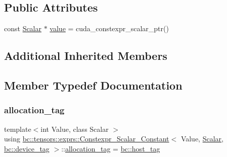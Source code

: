 \subsection*{Public Attributes}
\begin{DoxyCompactItemize}
\item 
const \hyperlink{namespacebc_aa12ac55ee2c43dc082894dd3859daee1}{Scalar} $\ast$ \hyperlink{structbc_1_1tensors_1_1exprs_1_1Constexpr__Scalar__Constant_3_01Value_00_01Scalar_00_01bc_1_1device__tag_01_4_aea23e94b5df6da8f57a6743fba40c72c}{value} = cuda\+\_\+constexpr\+\_\+scalar\+\_\+ptr()
\end{DoxyCompactItemize}
\subsection*{Additional Inherited Members}


\subsection{Member Typedef Documentation}
\mbox{\label{structbc_1_1tensors_1_1exprs_1_1Constexpr__Scalar__Constant_3_01Value_00_01Scalar_00_01bc_1_1device__tag_01_4_ae30cc6d15fe72585a06d08f7e6dae128}} 
\subsubsection{\texorpdfstring{allocation\+\_\+tag}{allocation\_tag}}
{\footnotesize\ttfamily template$<$int Value, class Scalar $>$ \\
using \hyperlink{structbc_1_1tensors_1_1exprs_1_1Constexpr__Scalar__Constant}{bc\+::tensors\+::exprs\+::\+Constexpr\+\_\+\+Scalar\+\_\+\+Constant}$<$ Value, \hyperlink{namespacebc_aa12ac55ee2c43dc082894dd3859daee1}{Scalar}, \hyperlink{structbc_1_1device__tag}{bc\+::device\+\_\+tag} $>$\+::\hyperlink{structbc_1_1tensors_1_1exprs_1_1Constexpr__Scalar__Constant_3_01Value_00_01Scalar_00_01bc_1_1device__tag_01_4_ae30cc6d15fe72585a06d08f7e6dae128}{allocation\+\_\+tag} =  \hyperlink{structbc_1_1host__tag}{bc\+::host\+\_\+tag}}

